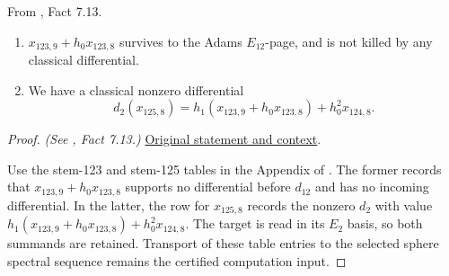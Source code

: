 \begin{fact}
\label{paper:7.13}
From \cite{LWX126}, Fact 7.13.\par
\label{fact:x_123_9}\label{fact:x1239}
    \begin{enumerate}

   \item  $x_{123,9}+h_0x_{123,8}$ survives to the Adams $E_{12}$-page, and is not killed by any classical differential.
    \item We have a classical nonzero differential 
    $$d_2 (x_{125,8}) = h_1 (x_{123,9}+h_0x_{123,8}) + h_0^2x_{124,8}.$$
   \end{enumerate}




\end{fact}
\begin{proof}
\textit{(See \cite{LWX126}, Fact 7.13.)} \href{paper/main.tex.html#L2377}{Original statement and context}.

Use the stem-123 and stem-125 tables in the Appendix of \cite{LWX126}. The former records that $x_{123,9}+h_0x_{123,8}$ supports no differential before $d_{12}$ and has no incoming differential. In the latter, the row for $x_{125,8}$ records the nonzero $d_2$ with value $h_1(x_{123,9}+h_0x_{123,8})+h_0^2x_{124,8}$. The target is read in its $E_2$ basis, so both summands are retained. Transport of these table entries to the selected sphere spectral sequence remains the certified computation input.
\end{proof}

